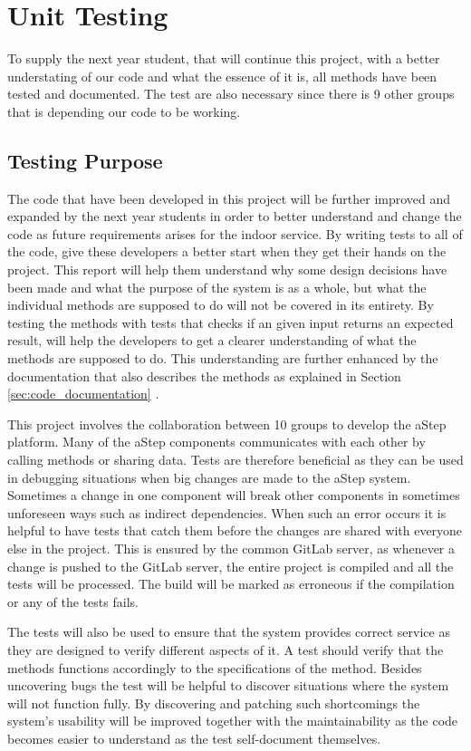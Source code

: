 \section{Unit Testing}\label{sec:unit_test}
To supply the next year student, that will continue this project, with a better understating of our code and what the essence of it is, all methods have been tested and documented. 
The test are also necessary since there is 9 other groups that is depending our code to be working.

\subsection{Testing Purpose}
The code that have been developed in this project will be further improved and expanded by the next year students in order to better understand and change the code as future requirements arises for the indoor service. 
By writing tests to all of the code, give these developers a better start when they get their hands on the project. 
This report will help them understand why some design decisions have been made and what the purpose of the system is as a whole, but what the individual methods are supposed to do will not be covered in its entirety. 
By testing the methods with tests that checks if an given input returns an expected result, will help the developers to get a clearer understanding of what the methods are supposed to do. 
This understanding are further enhanced by the documentation that also describes the methods as explained in Section \ref{sec:code_documentation} . 

This project involves the collaboration between 10 groups to develop the aStep platform. 
Many of the aStep components communicates with each other by calling methods or sharing data.
Tests are therefore beneficial as they can be used in debugging situations when big changes are made to the aStep system. 
Sometimes a change in one component will break other components in sometimes unforeseen ways such as indirect dependencies.
When such an error occurs it is helpful to have tests that catch them before the changes are shared with everyone else in the project. This is ensured by the common GitLab server, as whenever a change is pushed to the GitLab server, the entire project is compiled and all the tests will be processed. The build will be marked as erroneous if the compilation or any of the tests fails.

The tests will also be used to ensure that the system provides correct service as they are designed to verify different aspects of it.
A test should verify that the methods functions accordingly to the specifications of the method.
Besides uncovering bugs the test will be helpful to discover situations where the system will not function fully.
By discovering and patching such shortcomings the system's usability will be improved together with the maintainability as the code becomes easier to understand as the test self-document themselves.

